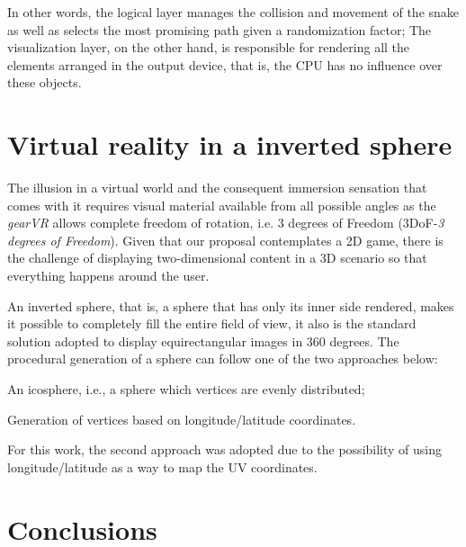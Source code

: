 \documentclass[12pt]{article}
\begin{document}
In other words, the logical layer manages the collision and movement of the snake as well as selects the most promising path given a randomization factor; The visualization layer, on the other hand, is responsible for rendering all the elements arranged in the output device, that is, the CPU has no influence over these objects.

\section{Virtual reality in a inverted sphere}
The illusion in a virtual world and the consequent immersion sensation that comes with it requires visual material available from all possible angles as the \textit{gearVR} allows complete freedom of rotation, i.e. 3 degrees of Freedom (3DoF-\textit{3 degrees of Freedom}). Given that our proposal contemplates a 2D game, there is the challenge of displaying two-dimensional content in a 3D scenario so that everything happens around the user.

An inverted sphere, that is, a sphere that has only its inner side rendered, makes it possible to completely fill the entire field of view, it also is the standard solution adopted to display equirectangular images in 360 degrees. The procedural generation of a sphere can follow one of the two approaches below:

\begin{enumerate}
  \begin{item} An icosphere, i.e., a sphere which vertices are evenly distributed;
 \end{item}
  \begin{item} Generation of vertices based on longitude/latitude coordinates. \end{item}
\end{enumerate}

For this work, the second approach was adopted due to the possibility of using longitude/latitude as a way to map the UV coordinates.

\section{Conclusions}




\end{document}
